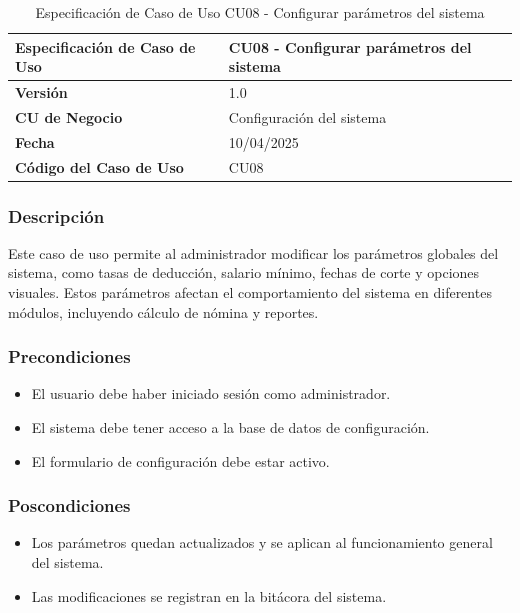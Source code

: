 \begin{table}[h]
	\centering
	\caption{Especificación de Caso de Uso CU08 - Configurar parámetros del sistema}
	\begin{tabular}{|p{5cm}|p{9cm}|}
		\hline
		\textbf{Especificación de Caso de Uso} & CU08 - Configurar parámetros del sistema \\ \hline
		\textbf{Versión}                       & 1.0                                      \\ \hline
		\textbf{CU de Negocio}                 & Configuración del sistema                \\ \hline
		\textbf{Fecha}                         & 10/04/2025                               \\ \hline
		\textbf{Código del Caso de Uso}        & CU08                                     \\ \hline
	\end{tabular}
\end{table}

\subsubsection*{Descripción}
Este caso de uso permite al administrador modificar los parámetros globales del sistema, como tasas de deducción, salario mínimo, fechas de corte y opciones visuales. Estos parámetros afectan el comportamiento del sistema en diferentes módulos, incluyendo cálculo de nómina y reportes.

\subsubsection*{Precondiciones}
\begin{itemize}
	\item El usuario debe haber iniciado sesión como administrador.
	\item El sistema debe tener acceso a la base de datos de configuración.
	\item El formulario de configuración debe estar activo.
\end{itemize}

\subsubsection*{Poscondiciones}
\begin{itemize}
	\item Los parámetros quedan actualizados y se aplican al funcionamiento general del sistema.
	\item Las modificaciones se registran en la bitácora del sistema.
\end{itemize}

